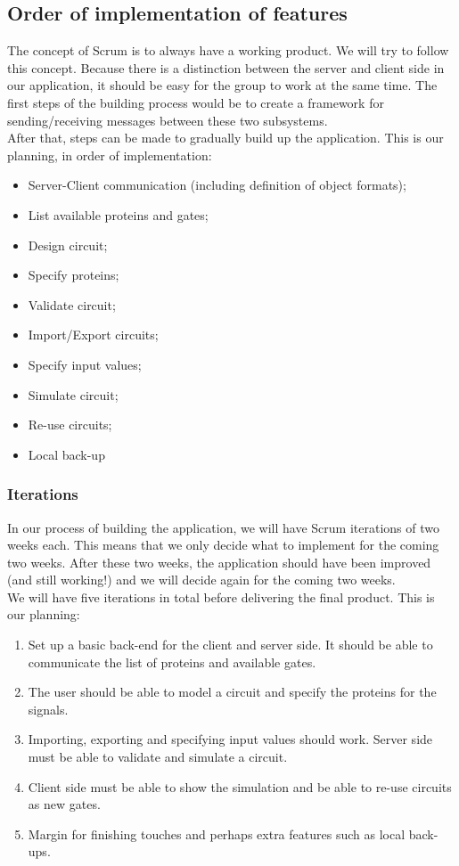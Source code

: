 \documentclass[a4paper]{article}
\begin{document}
\subsection{Order of implementation of features}
The concept of Scrum is to always have a working product. We will try to follow this concept. Because there is a distinction between the server and client side in our application, it should be easy for the group to work at the same time. The first steps of the building process would be to create a framework for sending/receiving messages between these two subsystems. \\

After that, steps can be made to gradually build up the application. This is our planning, in order of implementation:
\begin{itemize}
\item Server-Client communication (including definition of object formats);
\item List available proteins and gates;
\item Design circuit;
\item Specify proteins;
\item Validate circuit;
\item Import/Export circuits;
\item Specify input values;
\item Simulate circuit;
\item Re-use circuits;
\item Local back-up
\end{itemize}

\subsubsection{Iterations}
In our process of building the application, we will have Scrum iterations of two weeks each. This means that we only decide what to implement for the coming two weeks. After these two weeks, the application should have been improved (and still working!) and we will decide again for the coming two weeks. \\

We will have five iterations in total before delivering the final product. This is our planning:
\begin{enumerate}
\item Set up a basic back-end for the client and server side. It should be able to communicate the list of proteins and available gates.
\item The user should be able to model a circuit and specify the proteins for the signals.
\item Importing, exporting and specifying input values should work. Server side must be able to validate and simulate a circuit.
\item Client side must be able to show the simulation and be able to re-use circuits as new gates.
\item Margin for finishing touches and perhaps extra features such as local back-ups.
\end{enumerate}
\end{document}
